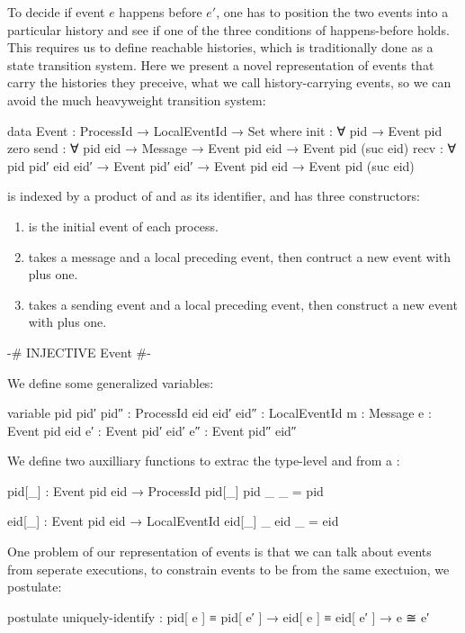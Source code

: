 \documentclass[acmsmall,review,anonymous]{acmart}
\theoremstyle{definition}
\theoremstyle{theorem}
\begin{document}
To decide if event $e$ happens before $e'$, one has to position the
two events into a particular history and see if one of the three
conditions of happens-before holds.  This requires us to define
reachable histories, which is traditionally done as a state transition
system. Here we present a novel representation of events that carry
the histories they preceive, what we call history-carrying events, so
we can avoid the much heavyweight transition system:
\begin{code}
data Event : ProcessId → LocalEventId → Set where
  init  : ∀ {pid} → Event pid zero
  send  : ∀ {pid} {eid} → Message → Event pid eid → Event pid (suc eid)
  recv  : ∀ {pid pid′} {eid eid′} → Event pid′ eid′ → Event pid eid → Event pid (suc eid)
\end{code}
\noindent {} is indexed by a product of
 and  as its
identifier, and has three constructors:
\begin{enumerate}
\item {} is the initial event of each process.
\item {} takes a message and a local preceding event, then
  contruct a new event with  plus one.
\item {} takes a sending event and a local preceding
  event, then construct a new event with  plus
  one.
\end{enumerate}

\begin{code}[hide]
{-# INJECTIVE Event #-}
\end{code}

We define some generalized variables:
\begin{code}
variable
  pid pid′ pid″ : ProcessId
  eid eid′ eid″ : LocalEventId
  m  : Message
  e  : Event pid  eid
  e′ : Event pid′ eid′
  e″ : Event pid″ eid″
\end{code}

We define two auxilliary functions to extrac the type-level
 and  from a :
\begin{code}
pid[_] : Event pid eid → ProcessId
pid[_] {pid} {_} _ = pid

eid[_] : Event pid eid → LocalEventId
eid[_] {_} {eid} _ = eid
\end{code}

One problem of our representation of events is that we can talk about
events from seperate executions, to constrain events to be from the
same exectuion, we postulate:
\begin{code}
postulate
  uniquely-identify : pid[ e ] ≡ pid[ e′ ] → eid[ e ] ≡ eid[ e′ ] → e ≅ e′
\end{code}
\end{document}
